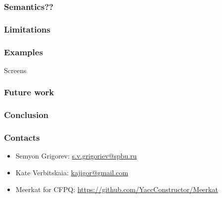 \documentclass[xcolor=table]{beamer}
\begin{document}
 
\begin{frame}
  \transwipe[direction=90]
  \frametitle{Semantics??}
\end{frame}

\begin{frame}
  \transwipe[direction=90]
  \frametitle{Limitations}
\end{frame}

            
\begin{frame}
  \transwipe[direction=90]
  \frametitle{Examples}         
  Screens
\end{frame}     

\begin{frame}
  \transwipe[direction=90]
  \frametitle{Future work}         
\end{frame}     
            
            
\begin{frame}
  \transwipe[direction=90]
  \frametitle{Conclusion}         
\end{frame}           
            
\begin{frame}
\transwipe[direction=90]
\frametitle{Contacts}
\begin{itemize}
  \item Semyon Grigorev: \href{mailto:s.v.grigoriev@spbu.ru}{s.v.grigoriev@spbu.ru}
  \item Kate Verbitskaia: \href{mailto:kajigor@gmail.com}{kajigor@gmail.com}
\end{itemize}
\begin{itemize}
  \item Meerkat for CFPQ: \href{https://github.com/YaccConstructor/Meerkat}{https://github.com/YaccConstructor/Meerkat}
\end{itemize}
\end{frame}
\end{document}
